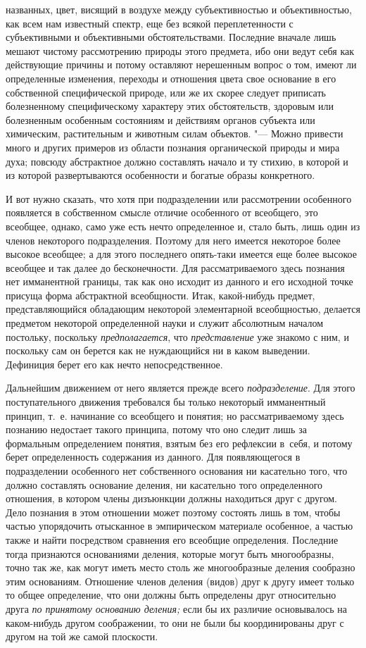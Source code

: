 названных, цвет, висящий в воздухе между субъективностью и объективностью,
как всем нам известный спектр, еще без всякой переплетенности с
субъективными и объективными обстоятельствами. Последние вначале лишь
мешают чистому рассмотрению природы этого предмета, ибо они ведут себя как
действующие причины и потому оставляют нерешенным вопрос о том, имеют ли
определенные изменения, переходы и отношения цвета свое основание в его
собственной специфической природе, или же их скорее следует приписать
болезненному специфическому характеру этих обстоятельств, здоровым или
болезненным особенным состояниям и действиям органов субъекта или
химическим, растительным и животным силам объектов. "--- Можно
привести много и других примеров из области познания органической природы и
мира духа; повсюду абстрактное должно составлять начало и ту стихию, в
которой и из которой развертываются особенности и богатые образы
конкретного.

И вот нужно сказать, что хотя при подразделении или
рассмотрении особенного появляется в собственном смысле отличие особенного
от всеобщего, это всеобщее, однако, само уже есть нечто определенное и,
стало быть, лишь один из членов некоторого подразделения. Поэтому для него
имеется некоторое более высокое всеобщее; а для этого последнего опять-таки
имеется еще более высокое всеобщее и так далее до
бесконечности. Для рассматриваемого здесь познания нет имманентной границы,
так как оно исходит из данного и его исходной точке присуща форма
абстрактной всеобщности. Итак, какой-нибудь предмет, представляющийся
обладающим некоторой элементарной всеобщностью, делается предметом
некоторой определенной науки и служит абсолютным началом постольку,
поскольку {\em предполагается},
что {\em представление}
уже знакомо с ним, и поскольку сам он берется как не
нуждающийся ни в каком выведении. Дефиниция берет его как нечто
непосредственное.

Дальнейшим движением от него является прежде всего
{\em подразделение}. Для
этого поступательного движения требовался бы только некоторый имманентный
принцип, т.~е. начинание со всеобщего и понятия; но рассматриваемому здесь
познанию недостает такого принципа, потому что оно следит лишь за
формальным определением понятия, взятым без его рефлексии в~себя, и потому
берет определенность содержания из данного. Для появляющегося в
подразделении особенного нет собственного основания ни касательно того, что
должно составлять основание деления, ни касательно того определенного
отношения, в котором члены дизъюнкции должны находиться друг с другом. Дело
познания в этом отношении может поэтому состоять лишь в том, чтобы частью
упорядочить отысканное в эмпирическом материале особенное, а частью также и
найти посредством сравнения его всеобщие определения. Последние тогда
признаются основаниями деления, которые могут быть многообразны, точно так
же, как могут иметь место столь же многообразные деления сообразно этим
основаниям. Отношение членов деления (видов) друг к другу имеет только то
общее определение, что они должны быть определены друг относительно друга
{\em по принятому основанию деления;} если бы их различие основывалось на
каком-нибудь другом соображении, то они не были бы координированы друг
с другом на той же самой плоскости.

